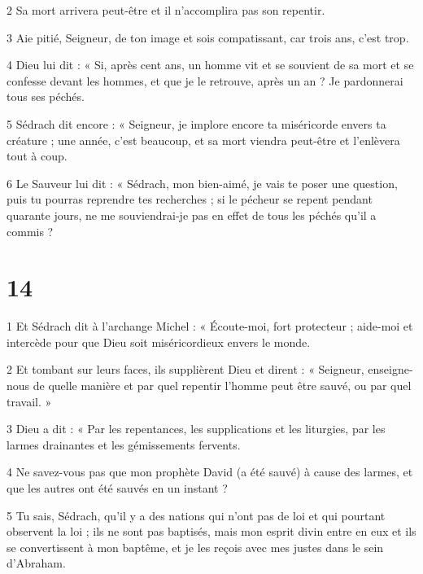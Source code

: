 \par 2 Sa mort arrivera peut-être et il n'accomplira pas son repentir.

\par 3 Aie pitié, Seigneur, de ton image et sois compatissant, car trois ans, c'est trop.

\par 4 Dieu lui dit : « Si, après cent ans, un homme vit et se souvient de sa mort et se confesse devant les hommes, et que je le retrouve, après un an ? Je pardonnerai tous ses péchés.

\par 5 Sédrach dit encore : « Seigneur, je implore encore ta miséricorde envers ta créature ; une année, c'est beaucoup, et sa mort viendra peut-être et l'enlèvera tout à coup.

\par 6 Le Sauveur lui dit : « Sédrach, mon bien-aimé, je vais te poser une question, puis tu pourras reprendre tes recherches ; si le pécheur se repent pendant quarante jours, ne me souviendrai-je pas en effet de tous les péchés qu'il a commis ?

\chapter{14}

\par 1 Et Sédrach dit à l'archange Michel : « Écoute-moi, fort protecteur ; aide-moi et intercède pour que Dieu soit miséricordieux envers le monde.

\par 2 Et tombant sur leurs faces, ils supplièrent Dieu et dirent : « Seigneur, enseigne-nous de quelle manière et par quel repentir l'homme peut être sauvé, ou par quel travail. »

\par 3 Dieu a dit : « Par les repentances, les supplications et les liturgies, par les larmes drainantes et les gémissements fervents.

\par 4 Ne savez-vous pas que mon prophète David (a été sauvé) à cause des larmes, et que les autres ont été sauvés en un instant ?

\par 5 Tu sais, Sédrach, qu'il y a des nations qui n'ont pas de loi et qui pourtant observent la loi ; ils ne sont pas baptisés, mais mon esprit divin entre en eux et ils se convertissent à mon baptême, et je les reçois avec mes justes dans le sein d'Abraham.

